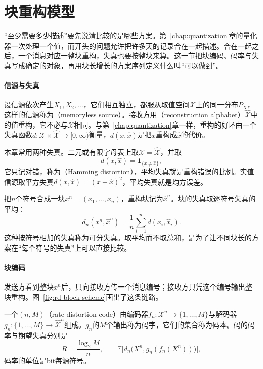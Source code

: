 \section{块重构模型}
\label{sec:rd-block-model}

“至少需要多少描述”要先说清比较的是哪些方案。第~\ref{chap:quantization}章的量化器一次处理一个值，而开头的问题允许把许多天的记录合在一起描述。合在一起之后，一个消息对应一整块重构，失真也要按整块来算。这一节把块编码、码率与失真写成确定的对象，再用块长增长的方案序列定义什么叫“可以做到”。

\paragraph{信源与失真}
设信源依次产生$X_1,X_2,\dots$，它们相互独立，都服从取值空间$\mathcal{X}$上的同一分布$P_X$，这样的信源称为（memoryless source）。接收方用（reconstruction alphabet）$\hat{\mathcal{X}}$中的值重构，它不必与$\mathcal{X}$相同。与第~\ref{chap:quantization}章一样，重构的好坏由一个失真函数$d:\mathcal{X}\times\hat{\mathcal{X}}\to[0,\infty)$衡量，$d(x,\hat{x})$是把$x$重构成$\hat{x}$的代价。

本章常用两种失真。二元或有限字母表上取$\mathcal{X}=\hat{\mathcal{X}}$，并取
\begin{equation}
  d(x,\hat{x})=\mathbf{1}_{\{x\neq\hat{x}\}},
  \label{eq:rd-hamming}
\end{equation}
它只记对错，称为（Hamming distortion），平均失真就是重构错误的比例。实值信源取平方失真$d(x,\hat{x})=(x-\hat{x})^{2}$，平均失真就是均方误差。

把$n$个符号合成一块$x^{n}=(x_1,\dots,x_n)$，重构块记为$\hat{x}^{n}$。块的失真取逐符号失真的平均：
\begin{equation}
  d_n(x^{n},\hat{x}^{n})=\frac{1}{n}\sum_{i=1}^{n}d(x_i,\hat{x}_i).
  \label{eq:rd-block-distortion}
\end{equation}
这种按符号相加的失真称为可分失真。取平均而不取总和，是为了让不同块长的方案在“每个符号的失真”上可以直接比较。

\paragraph{块编码}
发送方看到整块$x^{n}$后，只向接收方传一个消息编号；接收方只凭这个编号输出整块重构。图~\ref{fig:rd-block-scheme}画出了这条链路。

\begin{definition}[块编码与码率]
\label{def:rd-block-code}
一个$(n,M)$（rate-distortion code）由编码器$f_n:\mathcal{X}^{n}\to\{1,\dots,M\}$与解码器$g_n:\{1,\dots,M\}\to\hat{\mathcal{X}}^{n}$组成。$g_n$的$M$个输出称为码字，它们的集合称为码本。码的码率与期望失真分别是
\begin{equation}
  R=\frac{\log_2M}{n},\qquad
  \mathbb{E}\bigl[d_n\bigl(X^{n},g_n(f_n(X^{n}))\bigr)\bigr],
  \label{eq:rd-rate}
\end{equation}
码率的单位是bit每源符号。
\end{definition}

